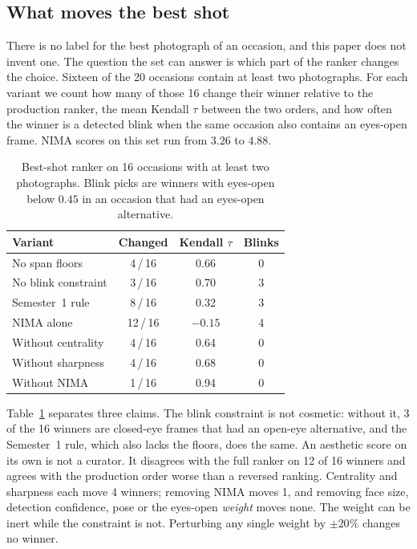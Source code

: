 \documentclass[conference]{IEEEtran}
\begin{document}
\subsection{What moves the best shot}
\label{sec:rank-eval}

There is no label for the best photograph of an occasion, and this paper does
not invent one. The question the set can answer is which part of the ranker
changes the choice. Sixteen of the 20 occasions contain at least two
photographs. For each variant we count how many of those 16 change their
winner relative to the production ranker, the mean Kendall $\tau$ between the
two orders, and how often the winner is a detected blink when the same
occasion also contains an eyes-open frame. NIMA scores on this set run from
$3.26$ to $4.88$.

\begin{table}[t]
\caption{Best-shot ranker on 16 occasions with at least two photographs.
Blink picks are winners with eyes-open below $0.45$ in an occasion that had
an eyes-open alternative.}
\label{tab:rank}
\centering
\scriptsize
\begin{tabular}{@{}>{\raggedright\arraybackslash}p{2.55cm}ccc@{}}
\toprule
Variant & Changed & Kendall $\tau$ & Blinks \\
\midrule
No span floors & 4\,/\,16 & 0.66 & 0 \\
No blink constraint & 3\,/\,16 & 0.70 & 3 \\
Semester~1 rule & 8\,/\,16 & 0.32 & 3 \\
NIMA alone & 12\,/\,16 & $-0.15$ & 4 \\
Without centrality & 4\,/\,16 & 0.64 & 0 \\
Without sharpness & 4\,/\,16 & 0.68 & 0 \\
Without NIMA & 1\,/\,16 & 0.94 & 0 \\
\bottomrule
\end{tabular}
\end{table}

Table~\ref{tab:rank} separates three claims. The blink constraint is not
cosmetic: without it, 3 of the 16 winners are closed-eye frames that had an
open-eye alternative, and the Semester~1 rule, which also lacks the floors,
does the same. An aesthetic score on its own is not a curator. It disagrees
with the full ranker on 12 of 16 winners and agrees with the production order
worse than a reversed ranking. Centrality and sharpness each move 4 winners;
removing NIMA moves 1, and removing face size, detection confidence, pose or
the eyes-open \emph{weight} moves none. The weight can be inert while the
constraint is not. Perturbing any single weight by $\pm 20\%$ changes no winner.
\end{document}
